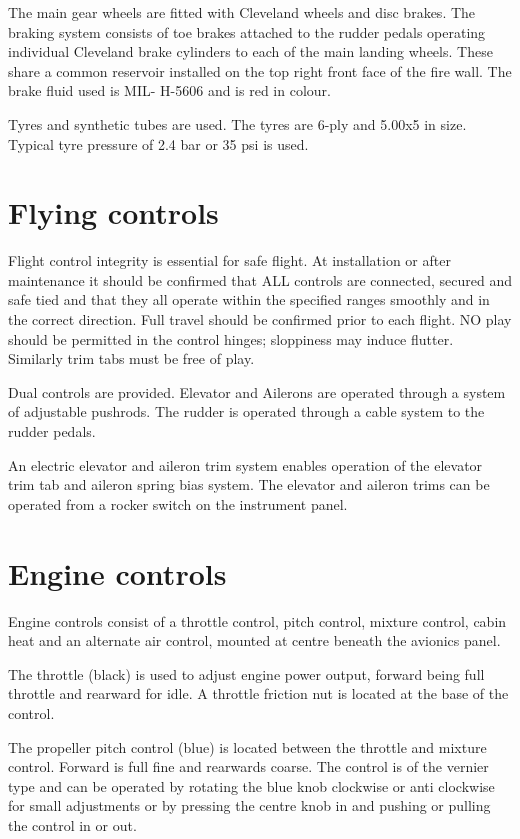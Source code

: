The main gear wheels are fitted with Cleveland wheels and disc brakes. The braking system consists of toe
brakes attached to the rudder pedals operating individual Cleveland brake cylinders to each of the main landing
wheels.
These share a common reservoir installed on the top right front face of the fire wall. The brake fluid used is MIL-
H-5606 and is red in colour.

Tyres and synthetic tubes are used.  The tyres are 6-ply and 5.00x5 in size.  Typical tyre pressure of 2.4 bar or 35 psi is used.

\section{Flying controls}
Flight control integrity is essential for safe flight. At installation or after maintenance it should be confirmed that
ALL controls are connected, secured and safe tied and that they all operate within the specified ranges
smoothly and in the correct direction. Full travel should be confirmed prior to each flight. NO play should be
permitted in the control hinges; sloppiness may induce flutter. Similarly trim tabs must be free of play.

Dual controls are provided. Elevator and Ailerons are operated through a system of adjustable pushrods. The
rudder is operated through a cable system to the rudder pedals. 

An electric elevator and aileron trim system
enables operation of the elevator trim tab and aileron spring bias system.
The elevator and aileron trims can be operated from a rocker switch on the instrument panel. 

\section{Engine controls}
Engine controls consist of a throttle control, pitch control, mixture control,
cabin heat and an alternate air control, mounted at centre beneath the avionics panel.

The throttle (black) is used to adjust engine power output, forward being full throttle and rearward for idle. A
throttle friction nut is located at the base of the control.

The propeller pitch control (blue) is located between the throttle and mixture control. Forward is full fine and
rearwards coarse. The control is of the vernier type and can be operated by rotating the blue knob clockwise or
anti clockwise for small adjustments or by pressing the centre knob in and pushing or pulling the control in or
out.

